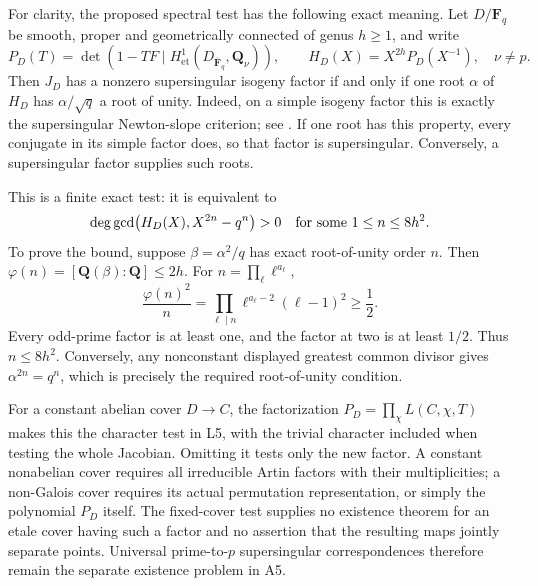 For clarity, the proposed spectral test has the following exact
meaning. Let $D/\mathbf F_q$ be smooth, proper and geometrically
connected of genus $h\ge1$, and write
\[
 P_D(T)=\det(1-TF\mid H^1_{\mathrm{et}}
       (D_{\overline{\mathbf F}_q},\mathbf Q_\nu)),
 \qquad
 H_D(X)=X^{2h}P_D(X^{-1}),\quad \nu\ne p.
\]
Then $J_D$ has a nonzero supersingular isogeny factor if and
only if one root $\alpha$ of $H_D$ has
$\alpha/\sqrt q$ a root of unity. Indeed, on a simple
isogeny factor this is exactly the supersingular
Newton-slope criterion; see
\cite[\S\S21.20--21.21(3)]{AC_Oort2008}. If one root has
this property, every conjugate in its simple factor does,
so that factor is supersingular. Conversely, a
supersingular factor supplies such roots.

This is a finite exact test: it is equivalent to
\[
 \deg\gcd\bigl(H_D(X),X^{2n}-q^n\bigr)>0
 \quad\hbox{for some }1\le n\le8h^2.
\]
To prove the bound, suppose $\beta=\alpha^2/q$ has exact
root-of-unity order $n$. Then
$\varphi(n)=[\mathbf Q(\beta):\mathbf Q]\le2h$.
For $n=\prod_\ell\ell^{a_\ell}$,
\[
 \frac{\varphi(n)^2}{n}
       =\prod_{\ell\mid n}\ell^{a_\ell-2}(\ell-1)^2
       \ge\frac12.
\]
Every odd-prime factor is at least one, and the factor
at two is at least $1/2$. Thus $n\le8h^2$.
Conversely, any nonconstant displayed greatest common
divisor gives $\alpha^{2n}=q^n$, which is precisely the
required root-of-unity condition.

For a constant abelian cover $D\to C$, the factorization
$P_D=\prod_\chi L(C,\chi,T)$ makes this the character
test in L5, with the trivial character included when
testing the whole Jacobian. Omitting it tests only the
new factor. A constant nonabelian cover requires all
irreducible Artin factors with their multiplicities;
a non-Galois cover requires its actual permutation
representation, or simply the polynomial $P_D$ itself.
The fixed-cover test supplies no existence theorem for
an etale cover having such a factor and no assertion
that the resulting maps jointly separate points.
Universal prime-to-$p$ supersingular correspondences
therefore remain the separate existence problem in A5.

